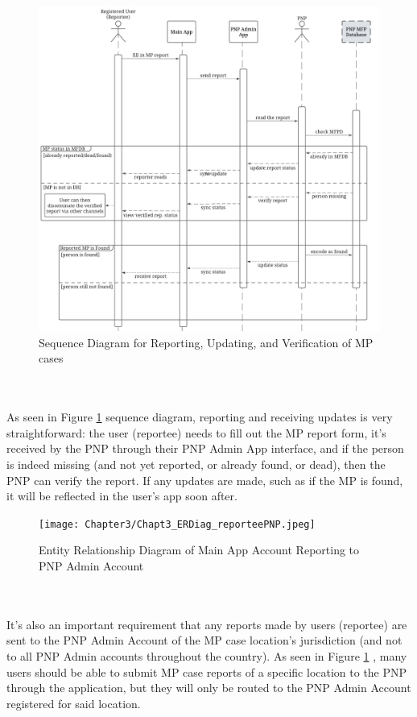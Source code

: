 \begin{figure}[!h]
    \centering
    \includegraphics{figures/Chapter3/Chapt3_seqDiag_report.jpeg}
    \caption{Sequence Diagram for Reporting, Updating, and Verification of MP cases}
    \label{fig:seqDiaReport}
\end{figure}
\\\\As seen in Figure \ref{fig:seqDiaReport} sequence diagram, reporting and receiving updates is very straightforward: the user (reportee) needs to fill out the MP report form, it’s received by the PNP through their PNP Admin App interface, and if the person is indeed missing (and not yet reported, or already found, or dead), then the PNP can verify the report. If any updates are made, such as if the MP is found, it will be reflected in the user’s app soon after.

\begin{figure}[!h]
    \centering
    \texttt{[image: Chapter3/Chapt3\_ERDiag\_reporteePNP.jpeg]}
    \caption{Entity Relationship Diagram of Main App Account Reporting to PNP Admin Account}
    \label{fig:ERDReportee}
\end{figure}
\\\\It’s also an important requirement that any reports made by users (reportee) are sent to the PNP Admin Account of the MP case location’s jurisdiction (and not to all PNP Admin accounts throughout the country). As seen in Figure \ref{fig:seqDiaReport} , many users should be able to submit MP case reports of a specific location to the PNP through the application, but they will only be routed to the PNP Admin Account registered for said location.

